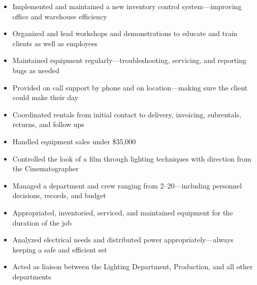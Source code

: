 \documentclass[letterpaper]{article}        %
\begin{document}
  \begin{itemize}
  
  \item Implemented and maintained a new inventory control system---improving office and warehouse efficiency
  
  \item Organized and lead workshops and demonstrations to educate and train clients as well as employees
  
  \item Maintained equipment regularly---troubleshooting, servicing, and reporting bugs as needed
  
  \item Provided on call support by phone and on location---making sure the client could make their day
  
  \item Coordinated rentals from initial contact to delivery, invoicing, subrentals, returns, and follow ups
  
  \item Handled equipment sales under \$35,000
  
  \end{itemize}
  
  \begin{itemize}
  
  \item Controlled the look of a film through lighting techniques with direction from the Cinematographer
  
  \item Managed a department and crew ranging from 2--20---including personnel decisions, records, and budget
  
  \item Appropriated, inventoried, serviced, and maintained equipment for the duration of the job
  
  \item Analyzed electrical needs and distributed power appropriately---always keeping a safe and efficient set
  
  \item Acted as liaison between the Lighting Department, Production, and all other departments
  
  \end{itemize}
  
\end{document}
